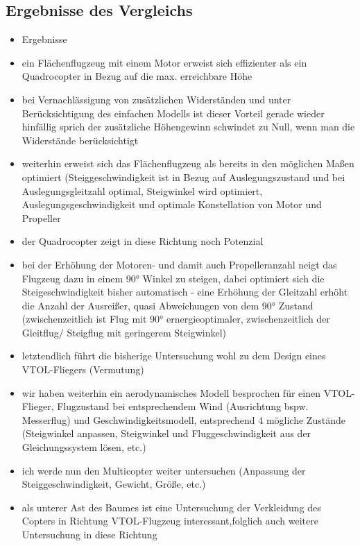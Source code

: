 \subsection{Ergebnisse des Vergleichs} 
\begin{itemize}
	\item Ergebnisse 
	\item ein Flächenflugzeug mit einem Motor erweist sich effizienter als
ein Quadrocopter in Bezug auf die max. erreichbare Höhe
	\item bei Vernachlässigung von zusätzlichen Widerständen und unter
Berücksichtigung des einfachen Modells ist dieser Vorteil gerade
wieder hinfällig sprich der zusätzliche Höhengewinn schwindet zu Null, wenn man die Widerstände berücksichtigt
	\item weiterhin erweist sich das Flächenflugzeug als bereits in den möglichen Maßen optimiert (Steiggeschwindigkeit ist in Bezug auf Auslegungszustand und bei Auslegungsgleitzahl optimal, Steigwinkel wird optimiert, Auslegungsgeschwindigkeit und optimale Konstellation von Motor und Propeller
	\item der Quadrocopter zeigt in diese Richtung noch Potenzial
	\item bei der Erhöhung der Motoren- und damit auch Propelleranzahl neigt das Flugzeug dazu in einem 90° Winkel zu steigen, dabei optimiert sich die Steigeschwindigkeit bisher automatisch
- eine Erhöhung der Gleitzahl erhöht die Anzahl der Ausreißer, quasi Abweichungen von dem 90° Zustand (zwischenzeitlich ist Flug mit 90° ernergieoptimaler, zwischenzeitlich der Gleitflug/ Steigflug mit geringerem Steigwinkel)
	\item letztendlich führt die bisherige Untersuchung wohl zu dem Design eines VTOL-Fliegers (Vermutung)
	\item wir haben weiterhin ein aerodynamisches Modell besprochen für einen VTOL-Flieger, Flugzustand bei entsprechendem Wind (Ausrichtung bspw. Messerflug) und Geschwindigkeitsmodell, entsprechend 4 mögliche Zustände (Steigwinkel anpassen, Steigwinkel und Fluggeschwindigkeit aus der Gleichungssystem lösen, etc.)
	\item ich werde nun den Multicopter weiter untersuchen (Anpassung der Steiggeschwindigkeit, Gewicht, Größe, etc.)
	\item als unterer Ast des Baumes ist eine Untersuchung der Verkleidung des Copters in Richtung VTOL-Flugzeug interessant,folglich auch weitere Untersuchung in diese Richtung

\end{itemize}



